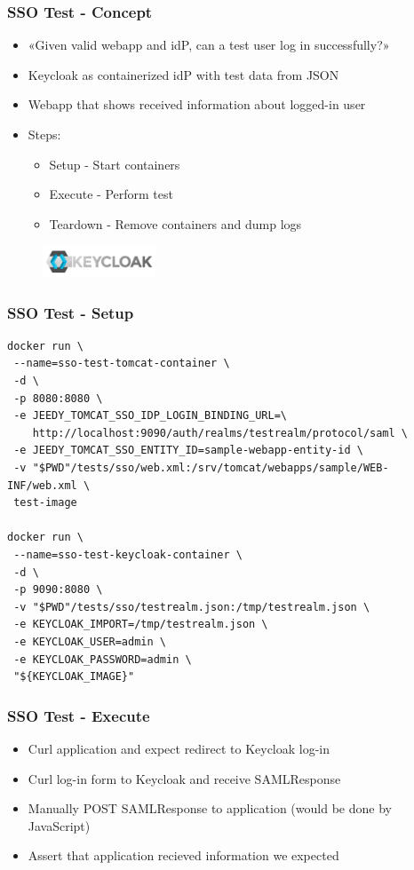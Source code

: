 \documentclass[14pt,aspectratio=169]{beamer}
\begin{document}
{\begin{frame}
  \frametitle{SSO Test - Concept} 
  \begin{itemize}
    \item «Given valid webapp and idP, can a test user log in successfully?»
    \item Keycloak as containerized idP with test data from JSON
    \item Webapp that shows received information about logged-in user
    \item Steps:
    \begin{itemize}
      \item Setup - Start containers
      \item Execute - Perform test
      \item Teardown - Remove containers and dump logs
    \end{itemize}
  \end{itemize}
  \begin{figure}
    \includegraphics[width=0.3\textwidth]{images/keycloak_logo.png}
  \end{figure}
\end{frame}

\begin{frame}[fragile]
  \frametitle{SSO Test - Setup}

  \begin{verbatim}
docker run \
 --name=sso-test-tomcat-container \
 -d \
 -p 8080:8080 \
 -e JEEDY_TOMCAT_SSO_IDP_LOGIN_BINDING_URL=\
    http://localhost:9090/auth/realms/testrealm/protocol/saml \
 -e JEEDY_TOMCAT_SSO_ENTITY_ID=sample-webapp-entity-id \
 -v "$PWD"/tests/sso/web.xml:/srv/tomcat/webapps/sample/WEB-INF/web.xml \
 test-image

docker run \
 --name=sso-test-keycloak-container \
 -d \
 -p 9090:8080 \
 -v "$PWD"/tests/sso/testrealm.json:/tmp/testrealm.json \
 -e KEYCLOAK_IMPORT=/tmp/testrealm.json \
 -e KEYCLOAK_USER=admin \
 -e KEYCLOAK_PASSWORD=admin \
 "${KEYCLOAK_IMAGE}"
  \end{verbatim}
\end{frame}

\begin{frame}
  \frametitle{SSO Test - Execute}
  \begin{itemize}
    \item Curl application and expect redirect to Keycloak log-in
    \item Curl log-in form to Keycloak and receive SAMLResponse
    \item Manually POST SAMLResponse to application (would be done by JavaScript)
    \item Assert that application recieved information we expected
  \end{itemize}
\end{frame}

}
\end{document}

